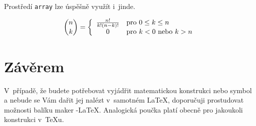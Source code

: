 \documentclass[a4paper, 11pt, twocolumn]{article}
\begin{document}
Prostředí \texttt{array} lze úspěšně využít i~jinde.

$$\binom{n}{k} = \left\{ \begin{array}{c l}
\frac{n!}{k!(n-k)!} & \text{pro } 0 \leq k \leq n \\
0 & \text{pro } k < 0 \text{ nebo } k > n
\end{array} \right. $$

\section{Závěrem}
V~případě, že budete potřebovat vyjádřit matematickou konstrukci nebo symbol a nebude se Vám dařit jej nalézt v~samotném \LaTeX, doporučuji prostudovat možnosti balíku maker \AmS-\LaTeX.
Analogická poučka platí obecně pro jakoukoli konstrukci v~\TeX u.
\end{document}
